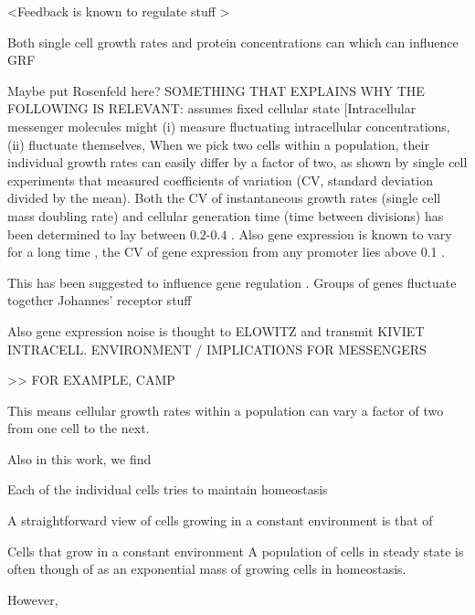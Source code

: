 <Feedback is known to regulate stuff \cite{Goyal2010}>

Both single cell growth rates and protein concentrations can 
which can influence GRF

Maybe put Rosenfeld here?
SOMETHING THAT EXPLAINS WHY THE FOLLOWING IS RELEVANT:
assumes fixed cellular state
[Intracellular messenger molecules might (i) measure fluctuating intracellular concentrations, (ii) fluctuate themselves, 
%
When we pick two cells within a population, their individual growth rates can easily differ by a factor of two, 
as shown by single cell experiments that measured coefficients of variation (CV, standard deviation divided by the mean).
%
Both the CV of instantaneous growth rates (single cell mass doubling rate) and cellular generation time (time between divisions) has been determined to lay between $0.2$-$0.4$ \cite{Kiviet2014, Hashimoto2016}.
%
Also gene expression is known to vary for a long time \cite{Elowitz2002}, 
the CV of gene expression from any promoter lies above 0.1 \cite{Keren2015}.


This has been suggested to influence gene regulation \cite{Rosenfeld2005}.
Groups of genes fluctuate together \cite{Stewart-Ornstein2012}
Johannes' receptor stuff


Also gene expression noise is thought to ELOWITZ
and transmit KIVIET
INTRACELL. ENVIRONMENT / IMPLICATIONS FOR MESSENGERS 

>> FOR EXAMPLE, CAMP

%
This means cellular growth rates within a population can vary a factor of two from one cell to the next.

Also in this work, we find 



Each of the individual cells tries to maintain homeostasis 


A straightforward view of cells growing in a constant environment is that of 

Cells that grow in a constant environment 
A population of cells in steady state is often though of as an exponential mass of growing cells in homeostasis.
%

% 
However, 
